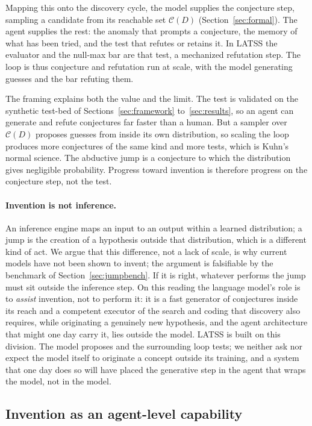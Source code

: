 \documentclass[11pt]{article}
\begin{document}
Mapping this onto the discovery cycle, the model supplies the conjecture step, sampling a candidate
from its reachable set $\mathcal{C}(D)$ (Section~\ref{sec:formal}). The agent supplies the rest: the
anomaly that prompts a conjecture, the memory of what has been tried, and the test that refutes or
retains it. In LATSS the evaluator and the null-max bar are that test, a mechanized refutation step.
The loop is thus conjecture and refutation run at scale, with the model generating guesses and the bar
refuting them.

The framing explains both the value and the limit. The test is validated on the synthetic test-bed of
Sections~\ref{sec:framework} to~\ref{sec:results}, so an agent can generate and refute conjectures far
faster than a human. But a sampler over $\mathcal{C}(D)$ proposes guesses from inside its own
distribution, so scaling the loop produces more conjectures of the same kind and more tests, which is
Kuhn's normal science. The abductive jump is a conjecture to which the distribution gives negligible
probability. Progress toward invention is therefore progress on the conjecture step, not the test.

\paragraph{Invention is not inference.} An inference engine maps an input to an output within a learned
distribution; a jump is the creation of a hypothesis outside that distribution, which is a different
kind of act. We argue that this difference, not a lack of scale, is why current models have not been
shown to invent; the argument is falsifiable by the benchmark of Section~\ref{sec:jumpbench}. If it is
right, whatever performs the jump must sit outside the inference step. On this reading the language model's role is to \emph{assist} invention, not to perform it: it is a fast
generator of conjectures inside its reach and a competent executor of the search and coding that
discovery also requires, while originating a genuinely new hypothesis, and the agent architecture that
might one day carry it, lies outside the model. LATSS is built on this division. The model proposes and
the surrounding loop tests; we neither ask nor expect the model itself to originate a concept outside its training, and a
system that one day does so will have placed the generative step in the agent that wraps the model, not
in the model.

\subsection{Invention as an agent-level capability}
\label{sec:agent}
\end{document}
